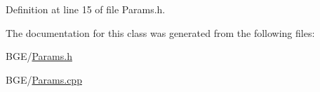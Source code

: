 Definition at line 15 of file Params.\-h.



The documentation for this class was generated from the following files\-:\begin{DoxyCompactItemize}
\item 
B\-G\-E/\hyperlink{_params_8h}{Params.\-h}\item 
B\-G\-E/\hyperlink{_params_8cpp}{Params.\-cpp}\end{DoxyCompactItemize}
